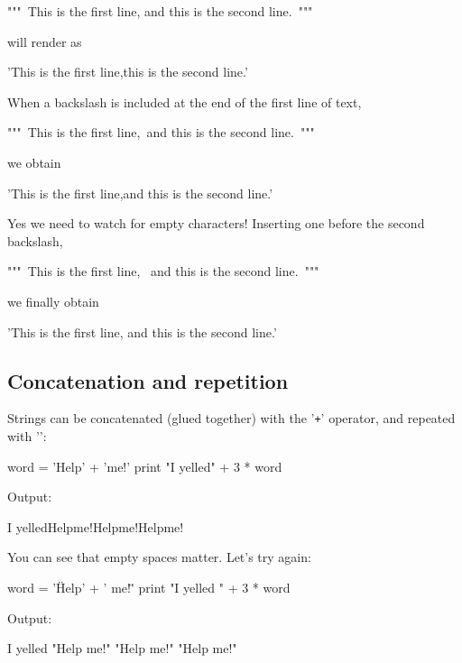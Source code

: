 \begin{bluecode}
"""\
This is the first line,
and this is the second line.\
""" 
\end{bluecode}
will render as

\begin{greencode}
'This is the first line,\nand this is the second line.' 
\end{greencode}
When a backslash is included at the end of the first line of text,

\begin{bluecode}
"""\
This is the first line,\
and this is the second line.\
""" 
\end{bluecode}
we obtain 

\begin{greencode}
'This is the first line,and this is the second line.'
\end{greencode}
Yes we need to watch for empty characters! Inserting one before the second 
backslash,

\begin{bluecode}
"""\
This is the first line, \
and this is the second line.\
""" 
\end{bluecode}
we finally obtain 

\begin{greencode}
'This is the first line, and this is the second line.'
\end{greencode}


\subsection{Concatenation and repetition}

Strings can be concatenated (glued together) with the '{\tt +}' operator, and repeated with '{\tt *}':

\begin{bluecode}
word = 'Help' + 'me!'
print "I yelled" + 3 * word
\end{bluecode}
Output:

\begin{greencode}
I yelledHelpme!Helpme!Helpme!
\end{greencode}
You can see that empty spaces matter. Let's try again:

\begin{bluecode}
word = '\"Help' + ' me!\" '
print "I yelled " + 3 * word
\end{bluecode}
Output:

\begin{greencode}
I yelled "Help me!" "Help me!" "Help me!"
\end{greencode}

